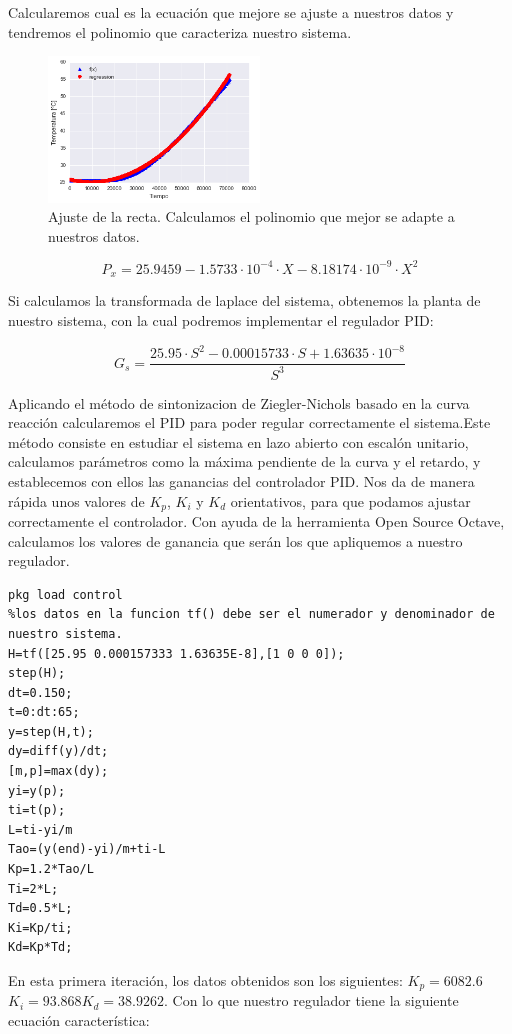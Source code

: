 Calcularemos cual es la ecuación que mejore se ajuste a nuestros datos y tendremos el polinomio que caracteriza nuestro sistema.

\begin{figure}[H]
    \centering
    \includegraphics[width=0.5\textwidth]{images/PLC/modelado/modelado_13_1.png}
    \caption[Ajuste de la recta.]{Ajuste de la recta. Calculamos el polinomio que mejor se adapte a nuestros datos.}
    \label{fig:plc_lazo_abierto2}
\end{figure}
$$P_x=  25.9459 -1.5733 \cdot 10^{-4} \cdot X - 8.18174 \cdot 10^{-9} \cdot X^2$$

Si calculamos la transformada de laplace del sistema, obtenemos la planta de nuestro sistema, con la cual podremos implementar el regulador PID:

$$G_s = \frac{25.95 \cdot S^2 - 0.00015733 \cdot S + 1.63635 \cdot 10^{-8}}{S^3}$$

Aplicando el método de sintonizacion de Ziegler-Nichols basado en la curva reacción calcularemos el PID para poder regular correctamente el sistema.Este método consiste en estudiar el sistema en lazo abierto con escalón unitario, calculamos parámetros como la máxima pendiente de la curva y el retardo, y establecemos con ellos las ganancias del controlador PID\cite{PID}. Nos da de manera rápida unos valores de $K_p$, $K_i$ y $K_d$ orientativos, para que podamos ajustar correctamente el controlador. Con ayuda de la herramienta Open Source Octave, calculamos los valores de ganancia que serán los que apliquemos a nuestro regulador.

\Cpp
\begin{lstlisting}
pkg load control
%los datos en la funcion tf() debe ser el numerador y denominador de nuestro sistema.
H=tf([25.95 0.000157333 1.63635E-8],[1 0 0 0]);
step(H);
dt=0.150;
t=0:dt:65;
y=step(H,t);
dy=diff(y)/dt;
[m,p]=max(dy);
yi=y(p);
ti=t(p);
L=ti-yi/m
Tao=(y(end)-yi)/m+ti-L
Kp=1.2*Tao/L
Ti=2*L;
Td=0.5*L;
Ki=Kp/ti;
Kd=Kp*Td;
\end{lstlisting}

En esta primera iteración, los datos obtenidos son los siguientes: $K_p = 6082.6$ $K_i=93.868 K_d=38.9262$. Con lo que nuestro regulador tiene la siguiente ecuación característica:


